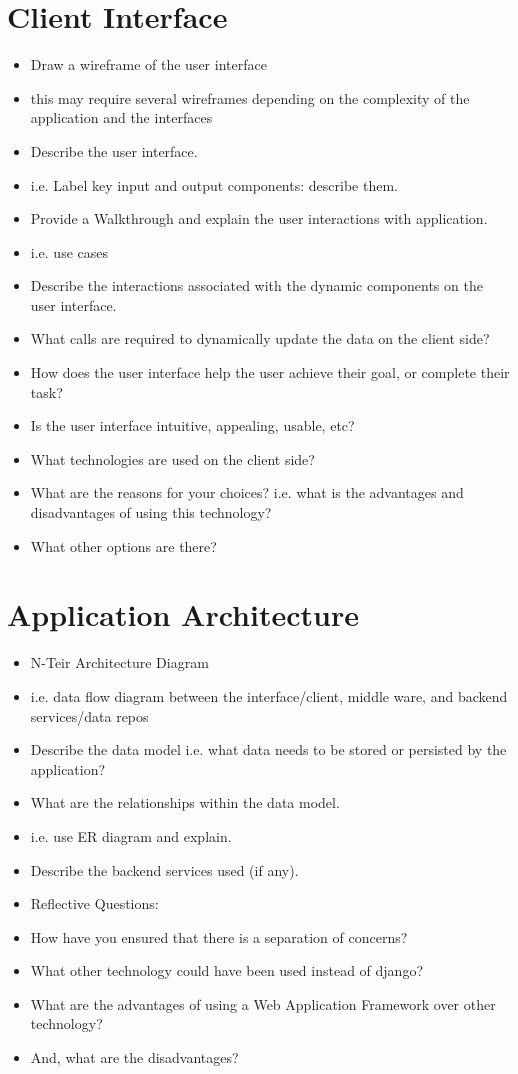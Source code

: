 \documentclass{sig-alt-release2}
\begin{document}
\section{Client Interface}
\begin{itemize}
\item	Draw a wireframe of the user interface
\item	this may require several wireframes depending on the complexity of the application and the interfaces
\item	Describe the user interface.
\item	i.e. Label key input and output components: describe them.
\item	Provide a Walkthrough and explain the user interactions with application. 
\item	i.e. use cases
\item	Describe the interactions associated with the dynamic components on the user interface.
\item	What calls are required to dynamically update the data on the client side?
\item	How does the user interface help the user achieve their goal, or complete their task? 
\item	Is the user interface intuitive, appealing, usable, etc?
\item	What technologies are used on the client side? 
\item	What are the reasons for your choices? i.e. what is the advantages and disadvantages of using this technology? 
\item	What other options are there? 
\end{itemize}

\section{Application Architecture}
\begin{itemize}
\item	N-Teir Architecture Diagram
\item	i.e. data flow diagram between the interface/client, middle ware, and backend services/data repos
\item	Describe the data model i.e. what data needs to be stored or persisted by the application?
\item	What are the relationships within the data model.
\item	i.e. use ER diagram and explain.
\item	Describe the backend services used (if any).
\item	Reflective Questions: 
\item	How have you ensured that there is a separation of concerns? 
\item	What other technology could have been used instead of django? 
\item	What are the advantages of using a Web Application Framework over other technology? 
\item	And, what are the disadvantages?
\end{itemize}
\end{document}
